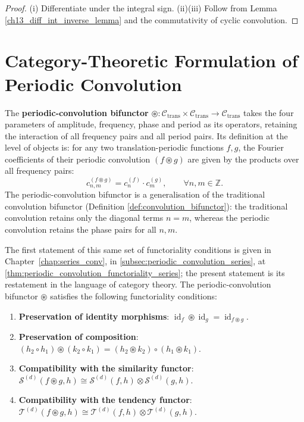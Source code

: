 \begin{proof}
(i) Differentiate under the integral sign. (ii)(iii) Follow from Lemma \ref{ch13_diff_int_inverse_lemma} and the commutativity of cyclic convolution.
\end{proof}

\section{Category-Theoretic Formulation of Periodic Convolution}\label{sec:periodic_convolution_category}

\begin{definition}\label{def:periodic_convolution_bifunctor}
The \textbf{periodic-convolution bifunctor} $\circledast: \mathcal{C}_{\text{trans}} \times \mathcal{C}_{\text{trans}} \to \mathcal{C}_{\text{trans}}$ takes the four parameters of amplitude, frequency, phase and period as its operators, retaining the interaction of all frequency pairs and all period pairs. Its definition at the level of objects is: for any two translation-periodic functions $f, g$, the Fourier coefficients of their periodic convolution $(f \circledast g)$ are given by the products over all frequency pairs:
\[
c_{n,m}^{(f \circledast g)} = c_n^{(f)} \cdot c_m^{(g)}, \qquad \forall n, m \in \mathbb{Z}.
\]
The periodic-convolution bifunctor is a generalisation of the traditional convolution bifunctor (Definition \ref{def:convolution_bifunctor}): the traditional convolution retains only the diagonal terms $n=m$, whereas the periodic convolution retains the phase pairs for all $n,m$.
\end{definition}

\begin{theorem}\label{thm:periodic_convolution_functoriality}
The first statement of this same set of functoriality conditions is given in Chapter~\ref{chap:series_conv}, in \cref{subsec:periodic_convolution_series}, at \cref{thm:periodic_convolution_functoriality_series}; the present statement is its restatement in the language of category theory.
The periodic-convolution bifunctor $\circledast$ satisfies the following functoriality conditions:
\begin{enumerate}[label=(\roman*)]
    \item \textbf{Preservation of identity morphisms}: $\operatorname{id}_f \circledast \operatorname{id}_g = \operatorname{id}_{f \circledast g}$.
    \item \textbf{Preservation of composition}: $(h_2 \circ h_1) \circledast (k_2 \circ k_1) = (h_2 \circledast k_2) \circ (h_1 \circledast k_1)$.
    \item \textbf{Compatibility with the similarity functor}: $\mathcal{S}^{(d)}(f \circledast g, h) \cong \mathcal{S}^{(d)}(f, h) \otimes \mathcal{S}^{(d)}(g, h)$.
    \item \textbf{Compatibility with the tendency functor}: $\mathcal{T}^{(d)}(f \circledast g, h) \cong \mathcal{T}^{(d)}(f, h) \otimes \mathcal{T}^{(d)}(g, h)$.
\end{enumerate}
\end{theorem}

